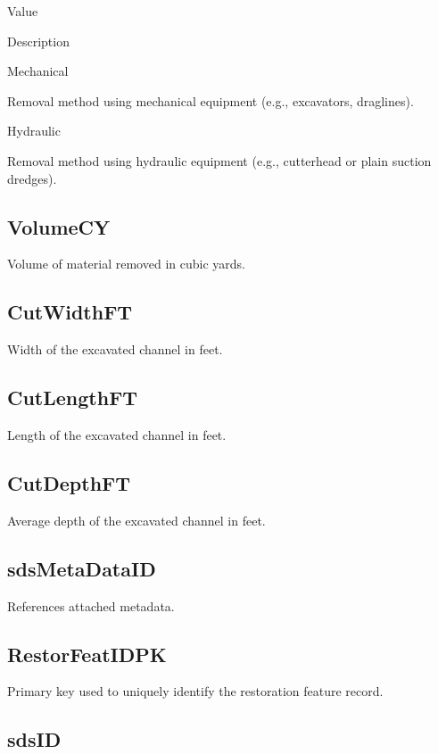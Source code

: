 \documentclass[
  letterpaper,
  DIV=11,
  numbers=noendperiod]{scrreprt}
\begin{document}
Value

Description

Mechanical

Removal method using mechanical equipment (e.g., excavators, draglines).

Hydraulic

Removal method using hydraulic equipment (e.g., cutterhead or plain
suction dredges).

\subsection{VolumeCY}\label{volumecy-1}

Volume of material removed in cubic yards.

\subsection{CutWidthFT}\label{cutwidthft-1}

Width of the excavated channel in feet.

\subsection{CutLengthFT}\label{cutlengthft-1}

Length of the excavated channel in feet.

\subsection{CutDepthFT}\label{cutdepthft-1}

Average depth of the excavated channel in feet.

\subsection{sdsMetaDataID}\label{sdsmetadataid-5}

References attached metadata.

\subsection{RestorFeatIDPK}\label{restorfeatidpk-5}

Primary key used to uniquely identify the restoration feature record.

\subsection{sdsID}\label{sdsid-5}
\end{document}

